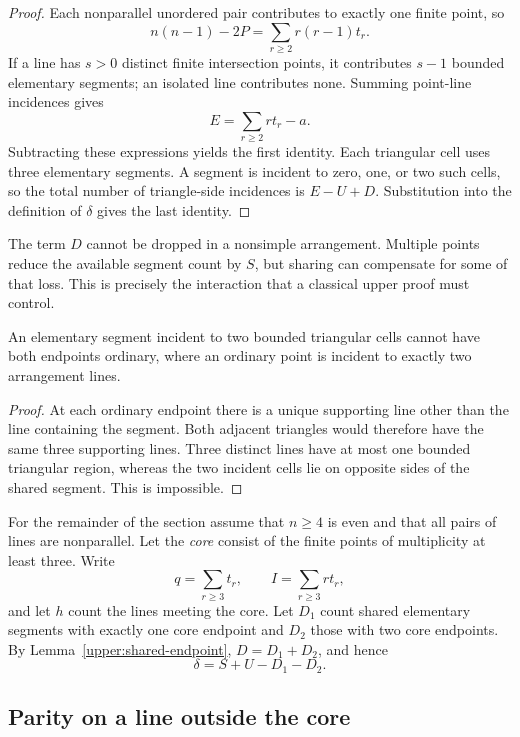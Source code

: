 \begin{proof}
Each nonparallel unordered pair contributes to exactly one finite point, so
\[
 n(n-1)-2P=\sum_{r\ge2}r(r-1)t_r.
\]
If a line has $s>0$ distinct finite intersection points, it contributes $s-1$ bounded elementary segments; an isolated line contributes none. Summing point-line incidences gives
\[
 E=\sum_{r\ge2}r t_r-a.
\]
Subtracting these expressions yields the first identity. Each triangular cell uses three elementary segments. A segment is incident to zero, one, or two such cells, so the total number of triangle-side incidences is $E-U+D$. Substitution into the definition of $\delta$ gives the last identity.
\end{proof}

The term $D$ cannot be dropped in a nonsimple arrangement. Multiple points reduce the available segment count by $S$, but sharing can compensate for some of that loss. This is precisely the interaction that a classical upper proof must control.

\begin{lemma}
\label{upper:shared-endpoint}
An elementary segment incident to two bounded triangular cells cannot have both endpoints ordinary, where an ordinary point is incident to exactly two arrangement lines.
\end{lemma}

\begin{proof}
At each ordinary endpoint there is a unique supporting line other than the line containing the segment. Both adjacent triangles would therefore have the same three supporting lines. Three distinct lines have at most one bounded triangular region, whereas the two incident cells lie on opposite sides of the shared segment. This is impossible.
\end{proof}

For the remainder of the section assume that $n\ge4$ is even and that all pairs of lines are nonparallel. Let the \emph{core} consist of the finite points of multiplicity at least three. Write
\[
 q=\sum_{r\ge3}t_r,\qquad I=\sum_{r\ge3}r t_r,
\]
and let $h$ count the lines meeting the core. Let $D_1$ count shared elementary segments with exactly one core endpoint and $D_2$ those with two core endpoints. By Lemma~\ref{upper:shared-endpoint}, $D=D_1+D_2$, and hence
\begin{equation}
 \delta=S+U-D_1-D_2.
 \label{upper:core-identity}
\end{equation}

\subsection{Parity on a line outside the core}

